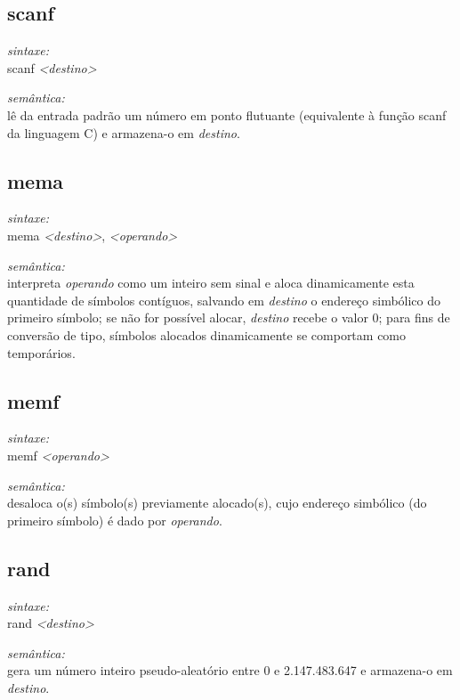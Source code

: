 \documentclass[12pt,a4paper,extrafontsizes,article]{memoir}
\newcommand*{\srcfont}{\fontfamily{pcr}\selectfont}
\begin{document}
\subsection{\textbf{scanf}}

\textit{sintaxe:}\\{\srcfont scanf \textit{<destino>}}

\noindent \textit{semântica:}\\lê da entrada padrão um número em ponto flutuante (equivalente à função {\srcfont scanf}
da linguagem C) e armazena-o em \textit{destino}.


\subsection{\textbf{mema}}

\textit{sintaxe:}\\{\srcfont mema  \textit{<destino>}, \textit{<operando>}}

\noindent \textit{semântica:}\\interpreta \textit{operando} como um inteiro sem sinal e aloca dinamicamente esta
quantidade de símbolos contíguos, salvando em \textit{destino} o endereço simbólico do primeiro símbolo; se não
for possível alocar, \textit{destino} recebe o valor 0; para fins de conversão de tipo, símbolos alocados dinamicamente
se comportam como temporários.


\subsection{\textbf{memf}}

\textit{sintaxe:}\\{\srcfont memf  \textit{<operando>}}

\noindent \textit{semântica:}\\desaloca o(s) símbolo(s) previamente alocado(s), cujo endereço simbólico (do primeiro
símbolo) é dado por \textit{operando}.


\subsection{\textbf{rand}}

\textit{sintaxe:}\\{\srcfont rand \textit{<destino>}}

\noindent \textit{semântica:}\\gera um número inteiro pseudo-aleatório entre 0 e 2.147.483.647 e armazena-o em
\textit{destino}.
\end{document}
